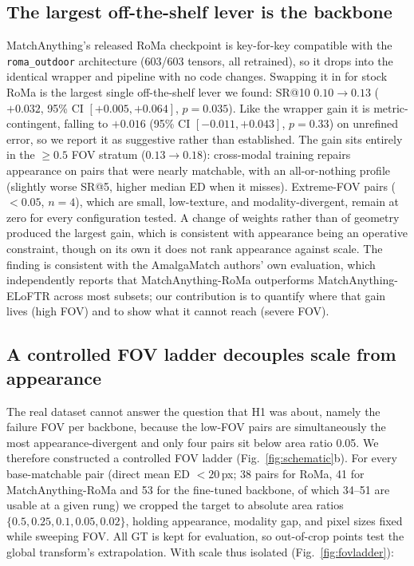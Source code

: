\documentclass[fleqn,10pt]{wlscirep}
\begin{document}
\subsection*{The largest off-the-shelf lever is the backbone}

MatchAnything's released RoMa checkpoint is key-for-key compatible with the \texttt{roma\_outdoor} architecture (603/603 tensors, all retrained), so it drops into the identical wrapper and pipeline with no code changes. Swapping it in for stock RoMa is the largest single off-the-shelf lever we found: SR@10 $0.10\rightarrow0.13$ ($+0.032$, 95\% CI $[+0.005,+0.064]$, $p=0.035$). Like the wrapper gain it is metric-contingent, falling to $+0.016$ (95\% CI $[-0.011,+0.043]$, $p=0.33$) on unrefined error, so we report it as suggestive rather than established. The gain sits entirely in the $\ge0.5$ FOV stratum ($0.13\rightarrow0.18$): cross-modal training repairs appearance on pairs that were nearly matchable, with an all-or-nothing profile (slightly worse SR@5, higher median ED when it misses). Extreme-FOV pairs ($<0.05$, $n=4$), which are small, low-texture, and modality-divergent, remain at zero for every configuration tested. A change of weights rather than of geometry produced the largest gain, which is consistent with appearance being an operative constraint, though on its own it does not rank appearance against scale. The finding is consistent with the AmalgaMatch authors' own evaluation, which independently reports that MatchAnything-RoMa outperforms MatchAnything-ELoFTR across most subsets\cite{durmaz2026foundation}; our contribution is to quantify where that gain lives (high FOV) and to show what it cannot reach (severe FOV).

\subsection*{A controlled FOV ladder decouples scale from appearance}

The real dataset cannot answer the question that H1 was about, namely the failure FOV per backbone, because the low-FOV pairs are simultaneously the most appearance-divergent and only four pairs sit below area ratio 0.05. We therefore constructed a controlled FOV ladder (Fig.~\ref{fig:schematic}b). For every base-matchable pair (direct mean ED $<20$\,px; 38 pairs for RoMa, 41 for MatchAnything-RoMa and 53 for the fine-tuned backbone, of which 34--51 are usable at a given rung) we cropped the target to absolute area ratios $\{0.5, 0.25, 0.1, 0.05, 0.02\}$, holding appearance, modality gap, and pixel sizes fixed while sweeping FOV. All GT is kept for evaluation, so out-of-crop points test the global transform's extrapolation. With scale thus isolated (Fig.~\ref{fig:fovladder}):
\end{document}
